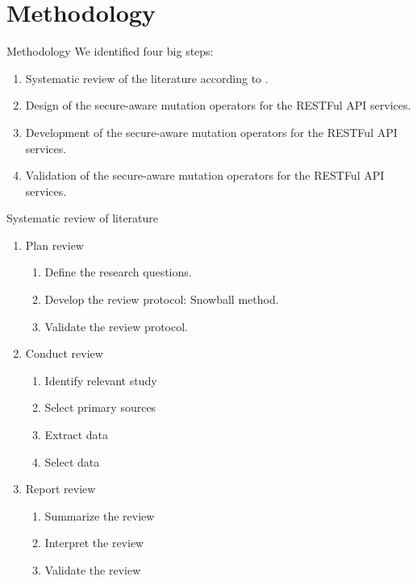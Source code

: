\documentclass[10pt]{beamer}
\theoremstyle{remark}
\theoremstyle{definition}
\begin{document}
\section{Methodology}

\begin{frame}[allowframebreaks]{Methodology}
  We identified four big steps: 
  \begin{enumerate}
    \item Systematic review of the literature according to \cite{Kitchenham2002}.
    \item Design of the secure-aware mutation operators for the RESTFul API services.
    \item Development of the secure-aware mutation operators for the RESTFul API services.
    \item Validation of the secure-aware mutation operators for the RESTFul API services.
  \end{enumerate}
\end{frame}

\begin{frame}[allowframebreaks]{Systematic review of literature}
  \begin{enumerate}
    \item Plan review
      \begin{enumerate}
        \item Define the research questions. 
        \item Develop the review protocol: Snowball method. 
        \item Validate the review protocol. 
      \end{enumerate}
    \item Conduct review
      \begin{enumerate}
        \item Identify relevant study
        \item Select primary sources
        \item Extract data
        \item Select data
      \end{enumerate}
    \item Report review
      \begin{enumerate}
        \item Summarize the review
        \item Interpret the review
        \item Validate the review
      \end{enumerate}
    \end{enumerate}
\end{frame}
\end{document}
